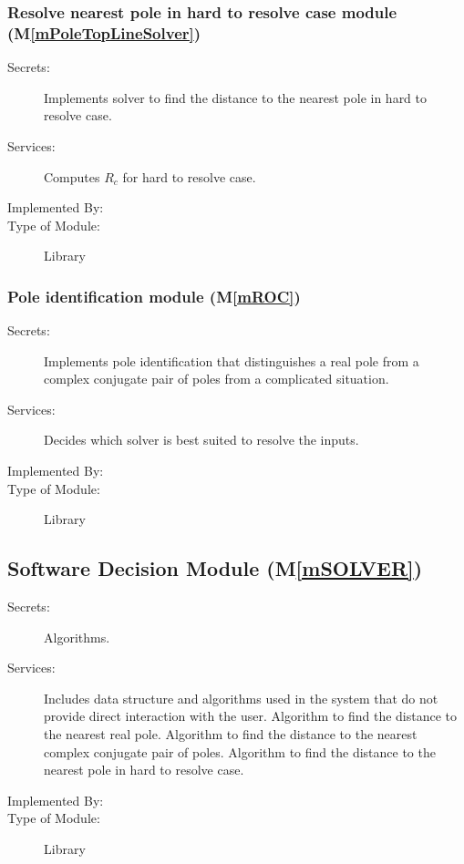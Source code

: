 \documentclass[12pt, titlepage]{article}
\newcommand{\mref}[1]{M\ref{#1}}
\begin{document}
\subsubsection{Resolve nearest pole in hard to resolve case module (\mref{mPoleTopLineSolver})}

\begin{description}
\item[Secrets:] Implements solver to find the distance to the nearest pole in hard to resolve case.
\item[Services:] Computes $R_c$ for hard to resolve case.
\item[Implemented By:] 
\item[Type of Module:] Library
\end{description}

\subsubsection{Pole identification module (\mref{mROC})}

\begin{description}
\item[Secrets:] Implements pole identification that distinguishes a real pole from
  a complex conjugate pair of poles from a complicated situation.
\item[Services:] Decides which solver is best suited to resolve the inputs.
\item[Implemented By:] 
\item[Type of Module:] Library
\end{description}

\subsection{Software Decision Module (\mref{mSOLVER})}

\begin{description}
\item[Secrets:] Algorithms.
\item[Services:] Includes data structure and algorithms used in the system that
  do not provide direct interaction with the user.
  Algorithm to find the distance to the nearest real pole.
  Algorithm to find the distance to the nearest complex conjugate pair of poles.
  Algorithm to find the distance to the nearest pole in hard to resolve case.
\item[Implemented By:] 
\item[Type of Module:] Library
\end{description}
\end{document}
